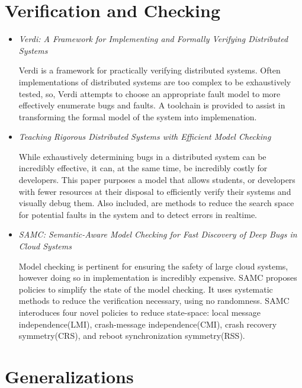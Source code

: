 \documentclass{article}
\begin{document}
\tableofcontents{}

\section{Verification and Checking}

\begin{itemize}
	\item
	\textit{Verdi: A Framework for Implementing and Formally Verifying Distributed Systems} \cite{Verdi}

	Verdi is a framework for practically verifying distributed systems. Often implementations of distributed systems are
	too complex to be exhaustively tested, so, Verdi attempts to choose an appropriate fault model to more effectively enumerate bugs and faults.
	A toolchain is provided to assist in transforming the formal model of the system into implemenation.

	\item
	\textit{Teaching Rigorous Distributed Systems with Efficient Model Checking} \cite{MichaelWAET2019}

	While exhaustively determining bugs in a distributed system can be incredibly effective, it can, at the same time, be incredibly costly for developers.
	This paper purposes a model that allows students, or developers with fewer resources at their disposal to efficiently verify their systems and visually debug them.
	Also included, are methods to reduce the search space for potential faults in the system and to detect errors in realtime.

	\item
	\textit{SAMC: Semantic-Aware Model Checking for Fast Discovery of Deep Bugs in Cloud Systems} \cite{SAMC}

	Model checking is pertinent for ensuring the safety of large cloud systems, however doing so in implementation is incredibly expensive. SAMC proposes policies to simplify the state of the model checking.
	It uses systematic methods to reduce the verification necessary, using no randomness. 
	SAMC interoduces four novel policies to reduce state-space: local message independence(LMI), crash-message independence(CMI), crash recovery symmetry(CRS), and reboot synchronization symmetry(RSS).

	
\end{itemize}

\section{Generalizations}
\end{document}
